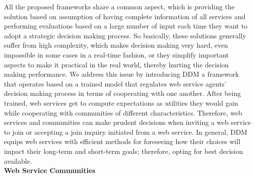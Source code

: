 \documentclass[11pt,onecolumn]{IEEEtran}
\begin{document}
{All the proposed frameworks share a common aspect, which is providing the solution based on assumption of having complete information of all services and performing evaluations based on a large number of input each time they want to adopt a strategic decision making process. 
So basically, these solutions generally suffer from high complexity, which makes decision making very hard, even impossible in some cases in a real-time fashion, or they simplify important aspects to make it practical in the real world, thereby hurting the decision making performance. We address this issue by introducing DDM a framework that operates based on a trained model that regulates web service agents' decision making process in terms of cooperating with one another. After being trained, web services get to compute expectations as utilities they would gain while cooperating with communities of different characteristics. Therefore, web services and communities can make prudent decisions when inviting a web service to join or accepting a join inquiry initiated from a web service. In general, DDM equips web services with efficient methods for foreseeing how their choices will impact their long-term and short-term goals; therefore, opting for best decision available. \\

\noindent \textbf{Web Service Communities}

}
\end{document}
